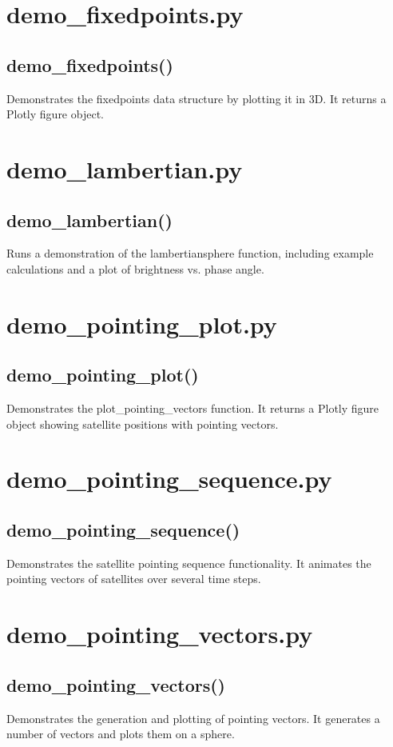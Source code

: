\documentclass{article}
\begin{document}
\section*{demo\_fixedpoints.py}
\subsection*{demo\_fixedpoints()}
Demonstrates the fixedpoints data structure by plotting it in 3D. It returns a Plotly figure object.

\section*{demo\_lambertian.py}
\subsection*{demo\_lambertian()}
Runs a demonstration of the lambertiansphere function, including example calculations and a plot of brightness vs. phase angle.

\section*{demo\_pointing\_plot.py}
\subsection*{demo\_pointing\_plot()}
Demonstrates the plot\_pointing\_vectors function. It returns a Plotly figure object showing satellite positions with pointing vectors.

\section*{demo\_pointing\_sequence.py}
\subsection*{demo\_pointing\_sequence()}
Demonstrates the satellite pointing sequence functionality. It animates the pointing vectors of satellites over several time steps.

\section*{demo\_pointing\_vectors.py}
\subsection*{demo\_pointing\_vectors()}
Demonstrates the generation and plotting of pointing vectors. It generates a number of vectors and plots them on a sphere.
\end{document}
